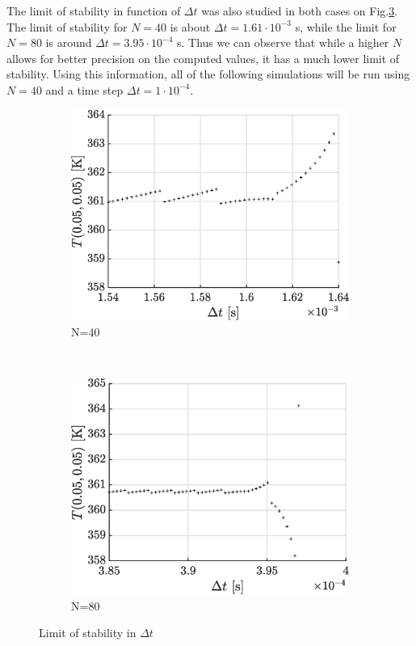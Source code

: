 \documentclass[a4paper,12pt,twoside]{article}
\begin{document}
The limit of stability in function of $\Delta t$ was also studied in both cases on Fig.\ref{fig:blim}. The limit of stability for $N=40$ is about $\Delta t = 1.61 \cdot 10^{-3}$ s, while the limit for $N=80$ is around $\Delta t = 3.95 \cdot 10^{-4}$ s. Thus we can observe that while a higher $N$ allows for better precision on the computed values, it has a much lower limit of stability. Using this information, all of the following simulations will be run using $N=40$ and a time step $\Delta t = 1\cdot 10^{-4}$.

\begin{figure}[h]
  \centering
  \begin{subfigure}[t]{0.45\textwidth}
    \includegraphics[width=\textwidth]{graphs/b_lim40.eps}

    \caption{N=40}
    \label{fig:b-lim40}
  \end{subfigure}
  ~
  \begin{subfigure}[t]{0.45\textwidth}
    \includegraphics[width=\textwidth]{graphs/b_lim80.eps}
    \caption{N=80}
    \label{fig:b-lim80}
  \end{subfigure}
  \caption{Limit of stability in $\Delta t$}
  \label{fig:blim}
\end{figure}
\end{document}
